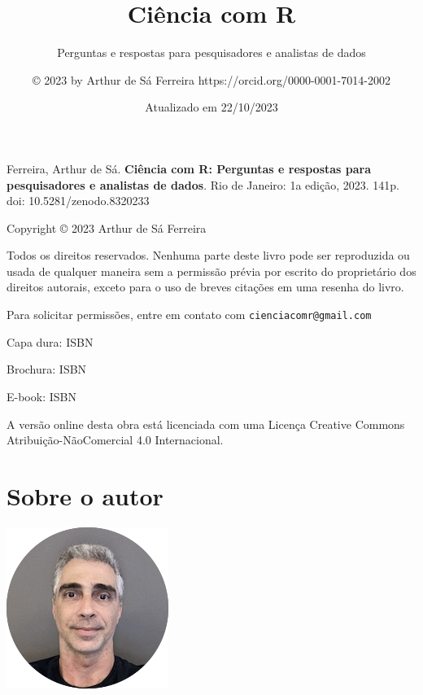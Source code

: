 \documentclass[
  a4paper,
]{book}
\title{\textbf{Ciência com R}}
\subtitle{Perguntas e respostas para pesquisadores e analistas de dados}
\author{© 2023 by Arthur de Sá Ferreira https://orcid.org/0000-0001-7014-2002}
\date{Atualizado em 22/10/2023}
\renewcommand{\href}[2]{#2\footnote{\url{#1}}}
\newcommand{\DisableFootNotes}{%
  \renewcommand{\footnote}[2][]{\relax}
}
\begin{document}
\maketitle


\newpage


\newpage

{
\setcounter{tocdepth}{1}
\tableofcontents
}
\listoffigures
\listoftables
\DisableFootNotes

\clearpage
\markboth{}{}

Ferreira, Arthur de Sá. \textbf{Ciência com R: Perguntas e respostas para pesquisadores e analistas de dados}. Rio de Janeiro: 1a edição, 2023. 141p. \href{https://doi.org/10.5281/zenodo.8320233}{doi: 10.5281/zenodo.8320233}

\vspace*{\fill}

Copyright © 2023 Arthur de Sá Ferreira

Todos os direitos reservados. Nenhuma parte deste livro pode ser reproduzida ou usada de qualquer maneira sem a permissão prévia por escrito do proprietário dos direitos autorais, exceto para o uso de breves citações em uma resenha do livro.

Para solicitar permissões, entre em contato com \href{mailto:cienciacomr@gmail.com}{\nolinkurl{cienciacomr@gmail.com}}

Capa dura: ISBN

Brochura: ISBN

E-book: ISBN

A versão online desta obra está licenciada com uma Licença Creative Commons Atribuição-NãoComercial 4.0 Internacional.

\hypertarget{sobre-o-autor}{%
\chapter*{Sobre o autor}\label{sobre-o-autor}}

\markboth{}{}

\includegraphics{images/ASF.png}
\end{document}
